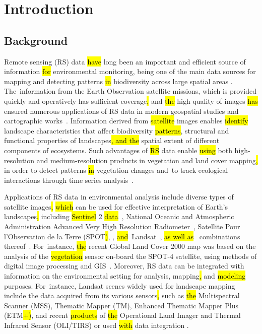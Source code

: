 \documentclass[coasts,article,accept,pdftex,oneauthor]{Definitions/mdpi}
\begin{document}
\section{Introduction}

\subsection{Background}
Remote sensing (RS) data \hl{have} long been an important and efficient source of information \hl{for} environmental monitoring, being one of the main data sources for mapping and detecting patterns \hl{in} biodiversity across large spatial areas \cite{FAGAN2024432}. The~information from the Earth Observation satellite missions, which is provided quickly and operatively has sufficient coverage\hl{, }and \hl{the} high quality of images \hl{has} ensured numerous applications of RS data in modern geospatial studies and cartographic works~\cite{LOEB2023}. {Information derived from \hl{satellite} images enables \hl{identify} landscape characteristics that affect biodiversity \hl{patterns}, structural and functional properties of landscapes\hl{, and the} spatial extent of different components of ecosystems. Such advantages of \hl{RS} data enable \hl{using} }both high-resolution and medium-resolution {products} in vegetation and land cover mapping\hl{,} in order to detect patterns \hl{in} vegetation changes\hl{ }and~to track ecological interactions through time series analysis~\cite{6352393,info14040249,Lemenkova202324}. 

{Applications of RS data in environmental analysis include diverse} types of satellite images\hl{,} {\hl{which} can be used }for effective interpretation of Earth's landscapes\hl{,} {including} \hl{Sentinel} 2 \hl{data}~\cite{ZHAO2024169152,Lemenkova202021,CHOUDHARY20222443}, National Oceanic and Atmospheric Administration Advanced Very High Resolution Radiometer~\cite{JI2017215,ZHAN2022112836}, Satellite Pour l'Observation de la Terre (SPOT\hl{)}, \cite{FENSHOLT20091886}, \hl{and}~Landsat~\cite{CHEN2023e19654,Lemenkova202323,LEMESIOS2024101153,SENAY2022113011,Lemenkova202321}, \hl{as well as}~ combinations thereof~\cite{XIE2023,RADELOFF2024113918}. For~instance, \hl{the} recent Global Land Cover 2000 map was based on the analysis of the \hl{vegetation} sensor on-board the SPOT-4 satellite, using methods of digital image processing and GIS~\cite{GIRI2005123,WANG2023311}. {Moreover, RS data can be integrated with information on the environmental setting for analysis, mapping\hl{,} and \hl{modeling} purposes. For~instance, }Landsat scenes widely used for landscape mapping include the data\hl{ }acquired from {its }various{ }sensors\hl{,} such as \hl{the} Multispectral Scanner (MSS), Thematic Mapper (TM), Enhanced Thematic Mapper Plus (ETM\hl{+)}, and recent \hl{products} of \hl{the} Operational Land Imager and Thermal Infrared Sensor (OLI/TIRS) {or used \hl{with} data integration }\cite{HE2018181,HUSSAIN2022103117,ESTOQUE2015205}.
\end{document}
